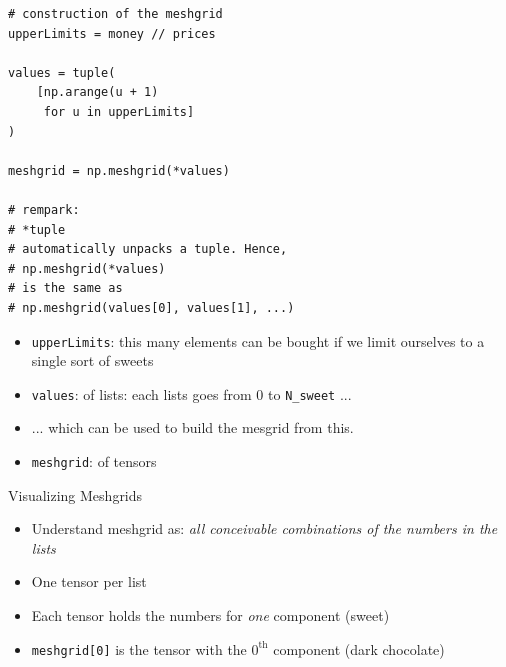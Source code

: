 
\begin{frame}[fragile]
%
\begin{tcbraster}[raster columns=2,
                  raster equal height,
                  nobeforeafter,
                  raster column skip=0.5cm]
\begin{codebox}
\begin{verbatim}
# construction of the meshgrid
upperLimits = money // prices

values = tuple(
    [np.arange(u + 1) 
     for u in upperLimits]
)

meshgrid = np.meshgrid(*values)

# rempark: 
# *tuple
# automatically unpacks a tuple. Hence,
# np.meshgrid(*values)
# is the same as
# np.meshgrid(values[0], values[1], ...)
\end{verbatim}
\end{codebox}
%
\begin{tcolorbox}[title=Elements in Code]
\begin{itemize}
\item \texttt{upperLimits}: this many elements can be bought if we limit ourselves to a single sort of sweets
\item \texttt{values}:  of lists: each lists goes from 0 to \texttt{N\_sweet} ...
\item ... which can be used to build the mesgrid from this.
\item \texttt{meshgrid}:  of tensors
\end{itemize}
\end{tcolorbox}
\end{tcbraster}
%
\end{frame}


\begin{frame}{Visualizing Meshgrids}
%
\begin{itemize}
\item Understand meshgrid as: \emph{all conceivable combinations of the numbers in the lists}
\item One tensor per list
\item Each tensor holds the numbers for \emph{one} component (\ie sweet)
\item \texttt{meshgrid[0]} is the tensor with the $0^{\text{th}}$ component (\ie dark chocolate)
\end{itemize}
%
\end{frame}

